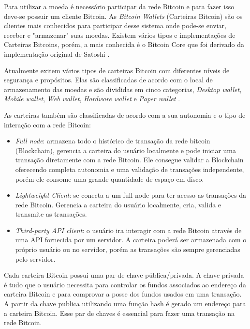 \documentclass[conference,compsoc]{IEEEtran}
\begin{document}
Para utilizar a moeda é necessário participar da rede Bitcoin e para fazer isso deve-se possuir um cliente Bitcoin. As \textit{Bitcoin Wallets} (Carteiras Bitcoin) são os clientes mais conhecidos para participar desse sistema onde pode-se enviar, receber e "armazenar"{} suas moedas. Existem vários tipos e implementações de Carteiras Bitcoins, porém, a mais conhecida é o Bitcoin Core que foi derivado da implementação original de Satoshi \cite{antonopoulos2017mastering}. 

Atualmente exitem vários tipos de carteiras Bitcoin com diferentes níveis de segurança e propósitos. Elas são classificadas de acordo com o local de armazenamento das moedas e são divididas em cinco categorias, \textit{Desktop wallet}, \textit{Mobile wallet}, \textit{Web wallet}, \textit{Hardware wallet} e \textit{Paper wallet} \cite{antonopoulos2017mastering}. 

As carteiras também são classificadas de acordo com a sua autonomia e o tipo de interação com a rede Bitcoin:

\begin{itemize}
\item \textit{Full node}: armazena todo o histórico de transação da rede bitcoin (Blockchain), gerencia a carteira do usuário localmente e pode iniciar uma transação diretamente com a rede Bitcoin. Ele consegue validar a Blockchain oferecendo completa autonomia e uma validação de transações independente, porém ele consome uma grande quantidade de espaço em disco.
\item \textit{Lightweight Client}: se conecta a um full node para ter acesso as transações da rede Bitcoin. Gerencia a carteira do usuário localmente, cria, valida e transmite as transações.
\item \textit{Third-party API client}: o usuário ira interagir com a rede Bitcoin através de uma API fornecida por um servidor. A carteira poderá ser armazenada com o próprio usuário ou no servidor, porém as transações são sempre gerenciadas pelo servidor.
\end{itemize}

Cada carteira Bitcoin possui uma par de chave pública/privada. A chave privada é tudo que o usuário necessita para controlar os fundos associados ao endereço da carteira Bitcoin e para comprovar a posse dos fundos usados em uma transação. A partir da chave publica utilizando uma função hash é gerado um endereço para a carteira Bitcoin. Esse par de chaves é essencial para fazer uma transação na rede Bitcoin.
\end{document}
